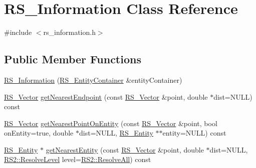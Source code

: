\hypertarget{classRS__Information}{\section{R\-S\-\_\-\-Information Class Reference}
\label{classRS__Information}
}


{\ttfamily \#include $<$rs\-\_\-information.\-h$>$}

\subsection*{Public Member Functions}
\begin{DoxyCompactItemize}
\item 
\hyperlink{classRS__Information_af7774f0cac8222df7d619d02e23c2098}{R\-S\-\_\-\-Information} (\hyperlink{classRS__EntityContainer}{R\-S\-\_\-\-Entity\-Container} \&entity\-Container)
\item 
\hyperlink{classRS__Vector}{R\-S\-\_\-\-Vector} \hyperlink{classRS__Information_a567a84e4695b290572828d4ecb6536a8}{get\-Nearest\-Endpoint} (const \hyperlink{classRS__Vector}{R\-S\-\_\-\-Vector} \&point, double $\ast$dist=N\-U\-L\-L) const 
\item 
\hyperlink{classRS__Vector}{R\-S\-\_\-\-Vector} \hyperlink{classRS__Information_a8a16ce644c16d3a5863728676f1ef3cf}{get\-Nearest\-Point\-On\-Entity} (const \hyperlink{classRS__Vector}{R\-S\-\_\-\-Vector} \&point, bool on\-Entity=true, double $\ast$dist=N\-U\-L\-L, \hyperlink{classRS__Entity}{R\-S\-\_\-\-Entity} $\ast$$\ast$entity=N\-U\-L\-L) const 
\item 
\hyperlink{classRS__Entity}{R\-S\-\_\-\-Entity} $\ast$ \hyperlink{classRS__Information_a7b07a51e06cb8eeaa535ed1e4f25e0a5}{get\-Nearest\-Entity} (const \hyperlink{classRS__Vector}{R\-S\-\_\-\-Vector} \&point, double $\ast$dist=N\-U\-L\-L, \hyperlink{classRS2_a1b2c5e3a3e9d1b03a9564229255faa20}{R\-S2\-::\-Resolve\-Level} level=\hyperlink{classRS2_a1b2c5e3a3e9d1b03a9564229255faa20a2a4a53124bbf724f5f486e1066d99a74}{R\-S2\-::\-Resolve\-All}) const 
\end{DoxyCompactItemize}
